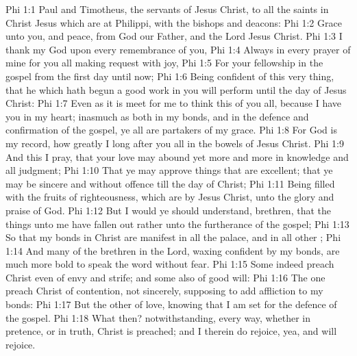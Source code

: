 \vs Phi 1:1 Paul and Timotheus, the servants of Jesus Christ, to all the saints in Christ Jesus which are at Philippi, with the bishops and deacons:
\vs Phi 1:2 Grace  unto you, and peace, from God our Father, and  the Lord Jesus Christ.
\vs Phi 1:3 I thank my God upon every remembrance of you,
\vs Phi 1:4 Always in every prayer of mine for you all making request with joy,
\vs Phi 1:5 For your fellowship in the gospel from the first day until now;
\vs Phi 1:6 Being confident of this very thing, that he which hath begun a good work in you will perform  until the day of Jesus Christ:
\vs Phi 1:7 Even as it is meet for me to think this of you all, because I have you in my heart; inasmuch as both in my bonds, and in the defence and confirmation of the gospel, ye all are partakers of my grace.
\vs Phi 1:8 For God is my record, how greatly I long after you all in the bowels of Jesus Christ.
\vs Phi 1:9 And this I pray, that your love may abound yet more and more in knowledge and  all judgment;
\vs Phi 1:10 That ye may approve things that are excellent; that ye may be sincere and without offence till the day of Christ;
\vs Phi 1:11 Being filled with the fruits of righteousness, which are by Jesus Christ, unto the glory and praise of God.
\vs Phi 1:12 But I would ye should understand, brethren, that the things  unto me have fallen out rather unto the furtherance of the gospel;
\vs Phi 1:13 So that my bonds in Christ are manifest in all the palace, and in all other ;
\vs Phi 1:14 And many of the brethren in the Lord, waxing confident by my bonds, are much more bold to speak the word without fear.
\vs Phi 1:15 Some indeed preach Christ even of envy and strife; and some also of good will:
\vs Phi 1:16 The one preach Christ of contention, not sincerely, supposing to add affliction to my bonds:
\vs Phi 1:17 But the other of love, knowing that I am set for the defence of the gospel.
\vs Phi 1:18 What then? notwithstanding, every way, whether in pretence, or in truth, Christ is preached; and I therein do rejoice, yea, and will rejoice.
